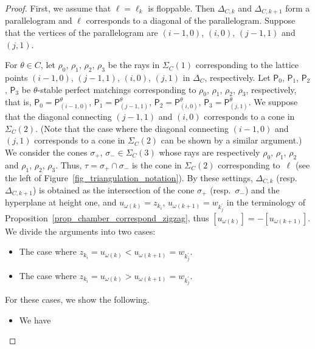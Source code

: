 \documentclass[pdftex]{sigma}
\numberwithin{equation}{section}
\theoremstyle{definition}
\newcommand{\sfP}{\mathsf{P}}
\newcommand{\permII}{\omega}
\begin{document}
\begin{proof}
First, we assume that $\ell=\ell_k$ is floppable.
Then $\Delta_{C,k}$ and $\Delta_{C,k+1}$ form a parallelogram and $\ell$ corresponds to a diagonal of the parallelogram.
Suppose that the vertices of the parallelogram are $(i-1,0)$, $(i,0)$, $(j-1,1)$ and $(j,1)$.

For $\theta\in C$, let $\rho_0$, $\rho_1$, $\rho_2$, $\rho_3$ be the rays in $\Sigma_C(1)$ corresponding to the lattice points
$(i-1,0)$, $(j-1,1)$, $(i,0)$, $(j,1)$ in $\Delta_C$, respectively.
Let $\sfP_0$, $\sfP_1$, $\sfP_2$, $\sfP_3$ be $\theta$-stable perfect matchings corresponding to $\rho_0$, $\rho_1$, $\rho_2$, $\rho_3$, respectively,
that is,
$
\sfP_0=\sfP_{(i-1,0)}^\theta$, $\sfP_1=\sfP_{(j-1,1)}^\theta$, $\sfP_2=\sfP_{(i,0)}^\theta$, $\sfP_3=\sfP_{(j,1)}^\theta$.
We suppose that the diagonal connecting $(j-1,1)$ and $(i,0)$ corresponds to a cone in $\Sigma_C(2)$.
(Note that the case where the diagonal connecting $(i-1,0)$ and $(j,1)$ corresponds to a cone in $\Sigma_C(2)$ can be shown by a similar argument.)
We consider the cones $\sigma_+$, $\sigma_-\in\Sigma_C(3)$ whose rays are respectively $\rho_0$, $\rho_1$, $\rho_2$ and $\rho_1$, $\rho_2$, $\rho_3$.
Thus, $\tau=\sigma_+\cap\sigma_-$ is the cone in $\Sigma_C(2)$ corresponding to~$\ell$ (see the left of Figure~\ref{fig_triangulation_notation}).
By these settings, $\Delta_{C,k}$ (resp.\ $\Delta_{C,k+1}$) is obtained as the intersection of the cone $\sigma_+$ (resp.\ $\sigma_-$) and the hyperplane at height one,
and $u_{\permII(k)}=z_{k_i}$, $u_{\permII(k+1)}=w_{k_j^\prime}$ in the terminology of Proposition~\ref{prop_chamber_correspond_zigzag},
thus $[u_{\permII(k)}]= -[u_{\permII(k+1)}]$. We divide the arguments into two cases:
\begin{itemize}\itemsep=0pt \setlength{\leftskip}{1cm}
\item[(Case 1)] The case where $z_{k_i}=u_{\permII(k)}<u_{\permII(k+1)}=w_{k_j^\prime}$.
\item[(Case 2)] The case where $z_{k_i}=u_{\permII(k)}>u_{\permII(k+1)}=w_{k_j^\prime}$.
\end{itemize}
For these cases, we show the following.
\begin{itemize}\itemsep=0pt \setlength{\leftskip}{1cm}\samepage
\item[(Case 1)] We have
\begin{equation}
\label{eq_degree_linebdl_main}

\end{equation}
\end{itemize}
\end{proof}
\end{document}
